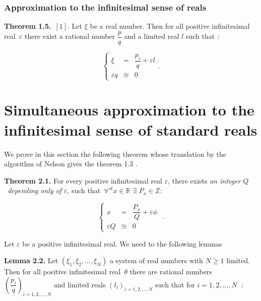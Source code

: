 \documentclass[12pt]{article}
\begin{document}
\subsubsection{Approximation to the infinitesimal sense of reals}

\noindent \textbf{Theorem 1.5.}\ $\left[ 1\right] $. Let $\xi $ be a real
number. Then for all positive infinitesimal real\textit{\ }$\varepsilon $
there exist a rational number $\dfrac{p}{q}$ and a limited real $l$ such that%
\textit{:}

\begin{equation}
\left\{ 
\begin{array}{ccc}
\xi & = & \dfrac{p_{i}}{q}+\varepsilon l \\ 
\varepsilon q & \cong & 0%
\end{array}%
\right. \text{.}  \tag{1.8}
\end{equation}

\section{Simultaneous approximation to the infinitesimal sense of standard
reals}

We prove in this section the following theorem whose translation by the
algorithm of Nelson gives the theorem 1.3 .\newline

\noindent \textbf{Theorem 2.1. }For every positive infinitesimal real $%
\varepsilon $, there exists \textit{an integer }$Q$\textit{\ depending only
of }$\varepsilon $, such that\textit{\ }$\forall ^{st}x\in \mathbb{R}$ $%
\exists $ $P_{x}\in \mathbb{Z}$:

\begin{equation}
\left\{ 
\begin{array}{ccc}
x & = & \dfrac{P_{x}}{Q}+\varepsilon \phi \\ 
\varepsilon Q & \cong & 0%
\end{array}%
\text{ .}\right.  \tag{2.1}
\end{equation}%
\newline

Let $\varepsilon $ be a positive infinitesimal real. We need to the
following lemmas\newline

\bigskip

\noindent \textbf{Lemma 2.2.} Let $\left( \xi _{1},\xi _{2},...,\xi
_{N}\right) $ a system of real numbers with $N\geq 1$ limited. Then for all
positive infinitesimal real\textit{\ }$\theta $ there are rational numbers $%
\left( \dfrac{p_{i}}{q}\right) _{i=1,2,...,N}$ and limited reals $\left(
l_{i}\right) _{i=1,2,...,N}$ such that for $i=1,2,...,N$\textit{\ :}
\end{document}
